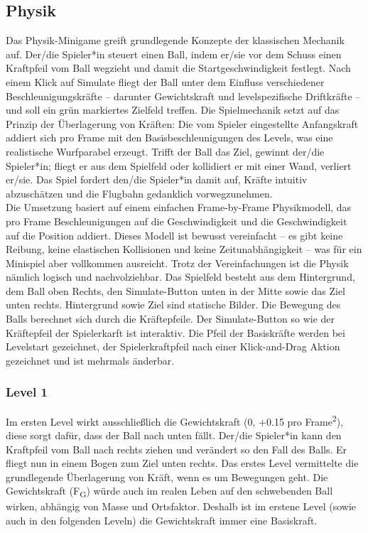 \subsection{Physik}
Das Physik-Minigame greift grundlegende Konzepte der klassischen Mechanik auf. Der/die Spieler*in steuert einen Ball, indem er/sie vor dem Schuss einen Kraftpfeil vom Ball wegzieht und damit die Startgeschwindigkeit festlegt. Nach einem Klick auf \glqq{}Simulate\grqq{} fliegt der Ball unter dem Einfluss verschiedener Beschleunigungskräfte – darunter Gewichtskraft und levelspezifische Driftkräfte – und soll ein grün markiertes Zielfeld treffen.
Die Spielmechanik setzt auf das Prinzip der Überlagerung von Kräften: Die vom Spieler eingestellte Anfangskraft addiert sich pro Frame mit den Basisbeschleunigungen des Levels, was eine realistische Wurfparabel erzeugt. Trifft der Ball das Ziel, gewinnt der/die Spieler*in; fliegt er aus dem Spielfeld oder kollidiert er mit einer Wand, verliert er/sie. Das Spiel fordert den/die Spieler*in damit auf, Kräfte intuitiv abzuschätzen und die Flugbahn gedanklich vorwegzunehmen. \\
Die Umsetzung basiert auf einem einfachen Frame-by-Frame Physikmodell, das pro Frame Beschleunigungen auf die Geschwindigkeit und die Geschwindigkeit auf die Position addiert. Dieses Modell ist bewusst vereinfacht – es gibt keine Reibung, keine elastischen Kollisionen und keine Zeitunabhängigkeit – was für ein Minispiel aber vollkommen ausreicht. Trotz der Vereinfachungen ist die Physik nämlich logisch und nachvolziehbar.
Das Spielfeld besteht aus dem Hintergrund, dem Ball oben Rechts, den Simulate-Button unten in der Mitte sowie das Ziel unten rechts. Hintergrund sowie Ziel sind statische Bilder. Die Bewegung des Balls berechnet sich durch die Kräftepfeile. Der Simulate-Button so wie der Kräftepfeil der Spielerkarft ist interaktiv. Die Pfeil der Basiskräfte werden bei Levelstart gezeichnet, der Spielerkraftpfeil nach einer Klick-and-Drag Aktion gezeichnet und ist mehrmals änderbar.

\subsubsection{Level 1}
Im ersten Level wirkt ausschließlich die Gewichtskraft (0, +0.15 pro Frame\textsuperscript{2}), diese sorgt dafür, dass der Ball nach unten fällt.
Der/die Spieler*in kann den Kraftpfeil vom Ball nach rechts ziehen und verändert so den Fall des Balls. Er fliegt nun in einem Bogen zum Ziel unten rechts.
Das erstes Level vermittelte die grundlegende Überlagerung von Kräft, wenn es um Bewegungen geht. Die Gewichtskraft (F\textsubscript{G}) würde auch im realen Leben auf den \glqq{}schwebenden\grqq{} Ball wirken, abhängig von Masse und Ortsfaktor. Deshalb ist im erstene Level (sowie auch in den folgenden Leveln) die Gewichtskraft immer eine Basiskraft.

